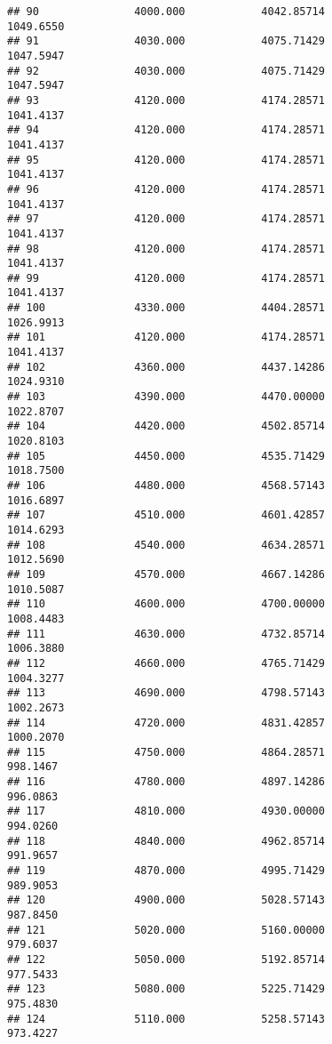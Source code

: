 \documentclass[]{article}
\begin{document}
\begin{verbatim}
## 90               4000.000            4042.85714                1049.6550
## 91               4030.000            4075.71429                1047.5947
## 92               4030.000            4075.71429                1047.5947
## 93               4120.000            4174.28571                1041.4137
## 94               4120.000            4174.28571                1041.4137
## 95               4120.000            4174.28571                1041.4137
## 96               4120.000            4174.28571                1041.4137
## 97               4120.000            4174.28571                1041.4137
## 98               4120.000            4174.28571                1041.4137
## 99               4120.000            4174.28571                1041.4137
## 100              4330.000            4404.28571                1026.9913
## 101              4120.000            4174.28571                1041.4137
## 102              4360.000            4437.14286                1024.9310
## 103              4390.000            4470.00000                1022.8707
## 104              4420.000            4502.85714                1020.8103
## 105              4450.000            4535.71429                1018.7500
## 106              4480.000            4568.57143                1016.6897
## 107              4510.000            4601.42857                1014.6293
## 108              4540.000            4634.28571                1012.5690
## 109              4570.000            4667.14286                1010.5087
## 110              4600.000            4700.00000                1008.4483
## 111              4630.000            4732.85714                1006.3880
## 112              4660.000            4765.71429                1004.3277
## 113              4690.000            4798.57143                1002.2673
## 114              4720.000            4831.42857                1000.2070
## 115              4750.000            4864.28571                 998.1467
## 116              4780.000            4897.14286                 996.0863
## 117              4810.000            4930.00000                 994.0260
## 118              4840.000            4962.85714                 991.9657
## 119              4870.000            4995.71429                 989.9053
## 120              4900.000            5028.57143                 987.8450
## 121              5020.000            5160.00000                 979.6037
## 122              5050.000            5192.85714                 977.5433
## 123              5080.000            5225.71429                 975.4830
## 124              5110.000            5258.57143                 973.4227

\end{verbatim}
\end{document}
